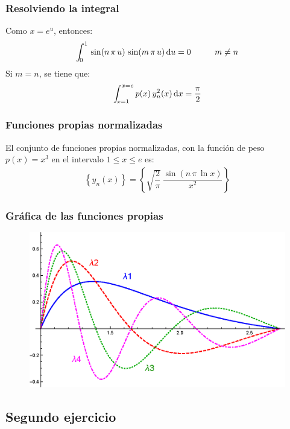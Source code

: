 \documentclass[12pt]{beamer}
\begin{document}
\begin{frame}
\frametitle{Resolviendo la integral}
Como $x = e^{u}$, entonces:
\begin{align*}
\scaleint{5ex}_{\bs 0}^{1} \, \sin (n \, \pi  \, u) \, \sin (m \, \pi  \, u) \dd{u} = 0 \hspace{1cm} m \neq n
\end{align*}
\pause
Si $m = n$, se tiene que:
\begin{align*}
\scaleint{5ex}_{\bs x=1}^{x=e} \, p(x) \, y_{n}^{2} (x) \dd{x} = \dfrac{\pi}{2}
\end{align*}
\end{frame}
\begin{frame}
\frametitle{Funciones propias normalizadas}
El conjunto de funciones propias normalizadas, con la función de peso $p(x) = x^{3}$ en el intervalo $1 \leq x \leq e$ es:
\begin{align*}
\left\{ y_{n} (x) \right\} = \left\{ \sqrt{\dfrac{2}{\pi}} \, \dfrac{\sin (n \, \pi \, \ln x)}{x^{2}} \right\}
\end{align*}
\end{frame}
\begin{frame}
\frametitle{Gráfica de las funciones propias}
\begin{figure}
    \centering
    \includegraphics[scale=0.85]{Imagenes/Ejercicio_SL_01_Funciones.eps}
\end{figure}
\end{frame}

\subsection{Segundo ejercicio}
\end{document}

